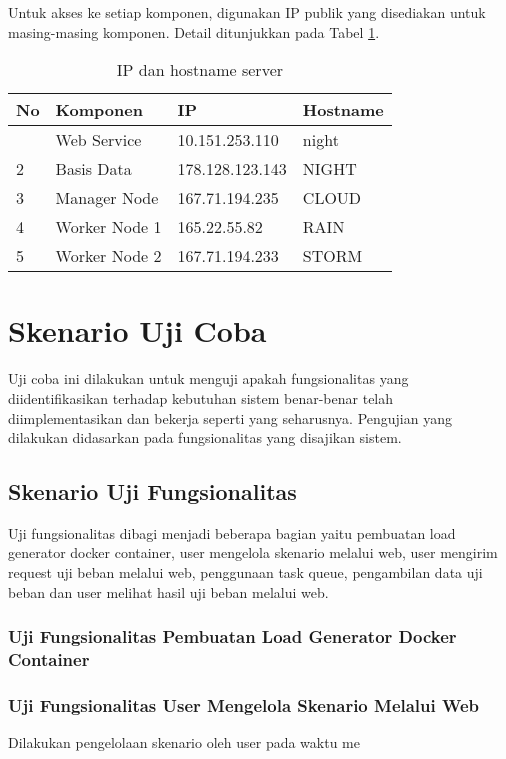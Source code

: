 		\indent Untuk akses ke setiap komponen, digunakan IP publik yang disediakan untuk masing-masing komponen. Detail ditunjukkan pada Tabel \ref{ipserver}.
		\begin{longtable}{|p{}|p{}|p{}|p{}|}
			\caption{IP dan hostname server} \label{ipserver} \\
			\hline
			\textbf{No} & \textbf{Komponen} & \textbf{IP} & \textbf{Hostname} \\ \hline
			\endhead
			\endfoot
			\endlastfoot
			1 & Web Service & 10.151.253.110 & night \\ \hline
			2 & Basis Data & 178.128.123.143 & NIGHT \\ \hline
			3 & Manager Node & 167.71.194.235 & CLOUD \\ \hline
			4 & Worker Node 1 & 165.22.55.82 & RAIN \\ \hline
			5 & Worker Node 2 & 167.71.194.233 & STORM \\ \hline
		\end{longtable}
	
	\section{Skenario Uji Coba} \label{skenarioujicoba}
		Uji coba ini dilakukan untuk menguji apakah fungsionalitas yang diidentifikasikan terhadap kebutuhan sistem benar-benar telah diimplementasikan dan bekerja seperti yang seharusnya. Pengujian yang dilakukan didasarkan pada fungsionalitas yang disajikan sistem.
		
	\subsection{Skenario Uji Fungsionalitas}
		Uji fungsionalitas dibagi menjadi beberapa bagian yaitu pembuatan load generator docker container, user mengelola skenario melalui web, user mengirim request uji beban melalui web, penggunaan task queue, pengambilan data uji beban dan user melihat hasil uji beban melalui web.
		
		\subsubsection{Uji Fungsionalitas Pembuatan Load Generator Docker Container}
		
		\subsubsection{Uji Fungsionalitas User Mengelola Skenario Melalui Web}
			Dilakukan pengelolaan skenario oleh user pada waktu me
		
